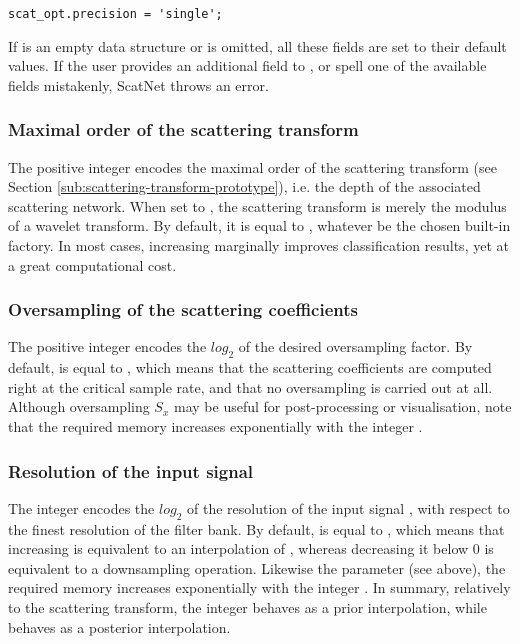\documentclass{article}
\begin{document}
\begin{lstlisting}
scat_opt.precision = 'single';
\end{lstlisting}

If  is an empty data structure or is omitted, all these fields are set to their default values. If the user provides an additional field to , or spell one of the available fields mistakenly, ScatNet throws an error.

\subsubsection{Maximal order of the scattering transform}
The positive integer  encodes the maximal order of the scattering transform (see Section \ref{sub:scattering-transform-prototype}), i.e. the depth of the associated scattering network. When set to , the scattering transform is merely the modulus of a wavelet transform. By default, it is equal to ,  whatever be the chosen built-in factory. In most cases, increasing  marginally improves classification results, yet at a great computational cost.

\subsubsection{Oversampling of the scattering coefficients}
The positive integer  encodes the $log_2$ of the desired oversampling factor. By default,  is equal to , which means that the scattering coefficients are computed right at the critical sample rate, and that no oversampling is carried out at all. Although oversampling $S_x$ may be useful for post-processing or visualisation, note that the required memory increases exponentially with the integer .

\subsubsection{Resolution of the input signal}
The integer  encodes the $log_2$ of the resolution of the input signal , with respect to the finest resolution of the filter bank. By default,  is equal to , which means that increasing  is equivalent to an interpolation of , whereas decreasing it below $0$ is equivalent to a downsampling operation. Likewise the parameter  (see above), the required memory increases exponentially with the integer . In summary, relatively to the scattering transform, the integer  behaves as a prior interpolation, while  behaves as a posterior interpolation.
\end{document}
